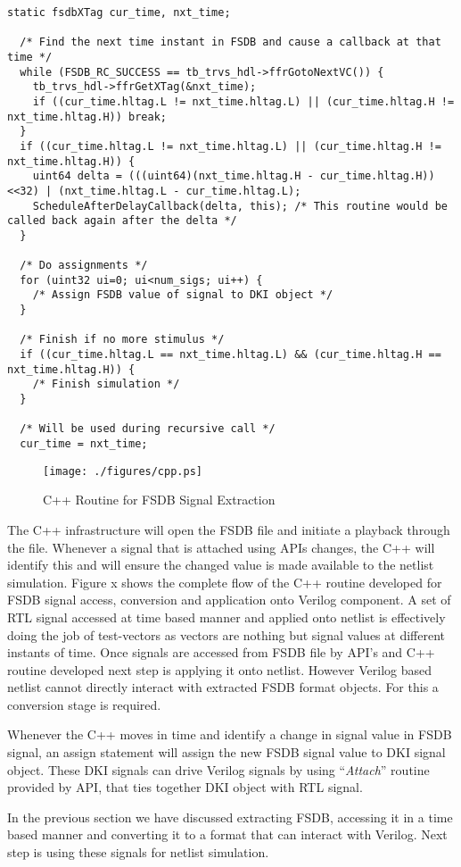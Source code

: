 \lstset{language=C++,
basicstyle=\footnotesize,
frame=shadowbox,
breaklines=true}          
\begin{lstlisting}[frame=single, caption=Stimulus Applicator Routine,label=nl:dualsim:sar] 
  static fsdbXTag cur_time, nxt_time;

  /* Find the next time instant in FSDB and cause a callback at that time */
  while (FSDB_RC_SUCCESS == tb_trvs_hdl->ffrGotoNextVC()) {
    tb_trvs_hdl->ffrGetXTag(&nxt_time);
    if ((cur_time.hltag.L != nxt_time.hltag.L) || (cur_time.hltag.H != nxt_time.hltag.H)) break;
  }
  if ((cur_time.hltag.L != nxt_time.hltag.L) || (cur_time.hltag.H != nxt_time.hltag.H)) {
    uint64 delta = (((uint64)(nxt_time.hltag.H - cur_time.hltag.H))<<32) | (nxt_time.hltag.L - cur_time.hltag.L);
    ScheduleAfterDelayCallback(delta, this); /* This routine would be called back again after the delta */
  }

  /* Do assignments */
  for (uint32 ui=0; ui<num_sigs; ui++) {
    /* Assign FSDB value of signal to DKI object */
  }

  /* Finish if no more stimulus */
  if ((cur_time.hltag.L == nxt_time.hltag.L) && (cur_time.hltag.H == nxt_time.hltag.H)) {
    /* Finish simulation */
  }

  /* Will be used during recursive call */
  cur_time = nxt_time;
\end{lstlisting}

\begin{figure}[h]
\centering
\texttt{[image: ./figures/cpp.ps]}
\caption{C++ Routine for FSDB Signal Extraction}
\label{fig:cpp.eps}
\end{figure}

The C++ infrastructure will open the FSDB file and initiate a playback through the file. Whenever a signal that is attached using APIs changes, the C++ will identify this and will ensure the changed value is made available to the netlist simulation.  Figure x shows the complete flow of the C++ routine developed for FSDB signal access, conversion and application onto Verilog component.
A set of RTL signal accessed at time based manner and applied onto netlist is effectively doing the job of test-vectors as vectors are nothing but signal values at different instants of time.
Once signals are accessed from FSDB file by API's and C++ routine developed next step is applying it onto netlist. However Verilog based netlist cannot directly interact with extracted FSDB format objects. For this a conversion stage is required.  

Whenever the C++ moves in time and identify a change in signal value in FSDB signal, an assign statement will assign the new FSDB signal value to DKI signal object.  These DKI signals can drive Verilog signals by using ``{\it Attach}'' routine provided by API, that ties together DKI object with RTL signal. 

In the previous section we have discussed extracting FSDB, accessing it in a time based manner and converting it to a format that can interact with Verilog. Next step is using these signals for netlist simulation.

